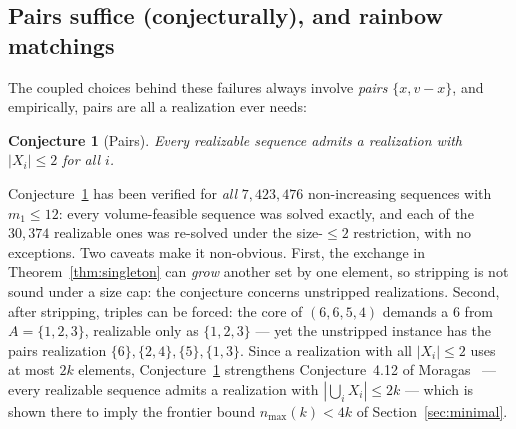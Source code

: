 \documentclass[11pt]{article}
\newtheorem{conjecture}[theorem]{Conjecture}
\theoremstyle{definition}
\theoremstyle{remark}
\begin{document}
\subsection{Pairs suffice (conjecturally), and rainbow matchings}\label{subsec:rainbow}

The coupled choices behind these failures always involve \emph{pairs}
$\{x,v-x\}$, and empirically, pairs are all a realization ever needs:

\begin{conjecture}[Pairs]\label{conj:pairs}
Every realizable sequence admits a realization with $|X_i|\le2$ for all $i$.
\end{conjecture}

Conjecture~\ref{conj:pairs} has been verified for \emph{all} $7{,}423{,}476$
non-increasing sequences with $m_1\le12$: every volume-feasible sequence was solved
exactly, and each of the $30{,}374$ realizable ones was re-solved under the
size-$\le2$ restriction, with no exceptions. Two caveats make it non-obvious. First,
the exchange in Theorem~\ref{thm:singleton} can \emph{grow} another set by one
element, so stripping is not sound under a size cap: the conjecture concerns
unstripped realizations. Second, after stripping, triples can be forced: the core of
$(6,6,5,4)$ demands a $6$ from $A=\{1,2,3\}$, realizable only as $\{1,2,3\}$ --- yet
the unstripped instance has the pairs realization $\{6\},\{2,4\},\{5\},\{1,3\}$.
Since a realization with all $|X_i|\le2$ uses at most $2k$ elements,
Conjecture~\ref{conj:pairs} strengthens Conjecture~4.12 of
Moragas~\cite{Moragas10} --- every realizable sequence admits a realization with
$|\bigcup_iX_i|\le2k$ --- which is shown there to imply the frontier bound
$n_{\max}(k)<4k$ of Section~\ref{sec:minimal}.
\end{document}
